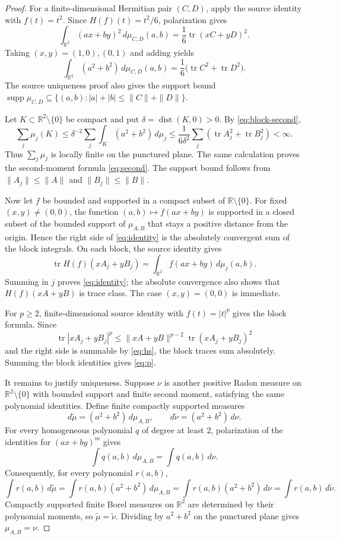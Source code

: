\documentclass[11pt]{article}
\newcommand{\R}{\mathbb R}
\newcommand{\tr}{\operatorname{tr}}
\newcommand{\supp}{\operatorname{supp}}
\begin{document}
\begin{proof}
For a finite-dimensional Hermitian pair $(C,D)$, apply the source identity
with $f(t)=t^2$.  Since $H(f)(t)=t^2/6$, polarization gives
\[
  \int_{\R^2} (ax+by)^2\,d\mu_{C,D}(a,b)
  =\frac{1}{6}\tr(xC+yD)^2 .
\]
Taking $(x,y)=(1,0),(0,1)$ and adding yields
\begin{equation}\label{eq:block-second}
  \int_{\R^2}(a^2+b^2)\,d\mu_{C,D}(a,b)
  =\frac{1}{6}\bigl(\tr C^2+\tr D^2\bigr).
\end{equation}
The source uniqueness proof also gives the support bound
$\supp\mu_{C,D}\subseteq\{(a,b): |a|+|b|\le \|C\|+\|D\|\}$.

Let $K\subset \R^2\setminus\{0\}$ be compact and put
$\delta=\operatorname{dist}(K,0)>0$.  By \eqref{eq:block-second},
\[
  \sum_j \mu_j(K)
  \le \delta^{-2}\sum_j \int_K(a^2+b^2)\,d\mu_j
  \le \frac{1}{6\delta^2}\sum_j(\tr A_j^2+\tr B_j^2)<\infty .
\]
Thus $\sum_j\mu_j$ is locally finite on the punctured plane.  The same
calculation proves the second-moment formula \eqref{eq:second}.  The support
bound follows from $\|A_j\|\le \|A\|$ and $\|B_j\|\le \|B\|$.

Now let $f$ be bounded and supported in a compact subset of
$\R\setminus\{0\}$.  For fixed $(x,y)\ne(0,0)$, the function
$(a,b)\mapsto f(ax+by)$ is supported in a closed subset of the bounded support
of $\mu_{A,B}$ that stays a positive distance from the origin.  Hence the
right side of \eqref{eq:identity} is the absolutely convergent sum of the block
integrals.  On each block, the source identity gives
\[
  \tr H(f)(xA_j+yB_j)
  =\int_{\R^2} f(ax+by)\,d\mu_j(a,b).
\]
Summing in $j$ proves \eqref{eq:identity}; the absolute convergence also shows
that $H(f)(xA+yB)$ is trace class.  The case $(x,y)=(0,0)$ is immediate.

For $p\ge2$, finite-dimensional source identity with $f(t)=|t|^p$ gives the
block formula.  Since
\[
  \tr|xA_j+yB_j|^p\le
  \|xA+yB\|^{p-2}\tr(xA_j+yB_j)^2
\]
and the right side is summable by \eqref{eq:hs}, the block traces sum
absolutely.  Summing the block identities gives \eqref{eq:p}.

It remains to justify uniqueness.  Suppose $\nu$ is another positive Radon
measure on $\R^2\setminus\{0\}$ with bounded support and finite second moment,
satisfying the same polynomial identities.  Define finite compactly supported
measures
\[
  d\widetilde\mu=(a^2+b^2)\,d\mu_{A,B},\qquad
  d\widetilde\nu=(a^2+b^2)\,d\nu .
\]
For every homogeneous polynomial $q$ of degree at least $2$, polarization of
the identities for $(ax+by)^m$ gives
\[
  \int q(a,b)\,d\mu_{A,B}=\int q(a,b)\,d\nu .
\]
Consequently, for every polynomial $r(a,b)$,
\[
  \int r(a,b)\,d\widetilde\mu
  =\int r(a,b)(a^2+b^2)\,d\mu_{A,B}
  =\int r(a,b)(a^2+b^2)\,d\nu
  =\int r(a,b)\,d\widetilde\nu .
\]
Compactly supported finite Borel measures on $\R^2$ are determined by their
polynomial moments, so $\widetilde\mu=\widetilde\nu$.  Dividing by $a^2+b^2$
on the punctured plane gives $\mu_{A,B}=\nu$.
\end{proof}
\end{document}
